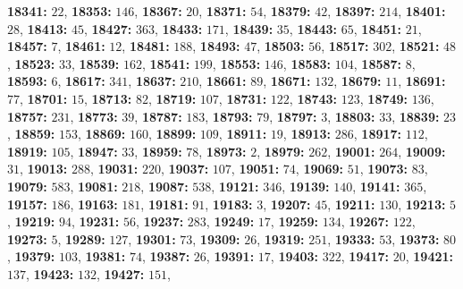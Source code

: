 \textsf{\bfseries 18341:} $22$, \textsf{\bfseries 18353:} $146$, \textsf{\bfseries 18367:} $20$, \textsf{\bfseries 18371:} $54$, \textsf{\bfseries 18379:} $42$, \textsf{\bfseries 18397:} $214$, \textsf{\bfseries 18401:} $28$, \textsf{\bfseries 18413:} $45$, \textsf{\bfseries 18427:} $363$, \textsf{\bfseries 18433:} $171$, \textsf{\bfseries 18439:} $35$, \textsf{\bfseries 18443:} $65$, \textsf{\bfseries 18451:} $21$, \textsf{\bfseries 18457:} $7$, \textsf{\bfseries 18461:} $12$, \textsf{\bfseries 18481:} $188$, \textsf{\bfseries 18493:} $47$, \textsf{\bfseries 18503:} $56$, \textsf{\bfseries 18517:} $302$, \textsf{\bfseries 18521:} $48$, \textsf{\bfseries 18523:} $33$, \textsf{\bfseries 18539:} $162$, \textsf{\bfseries 18541:} $199$, \textsf{\bfseries 18553:} $146$, \textsf{\bfseries 18583:} $104$, \textsf{\bfseries 18587:} $8$, \textsf{\bfseries 18593:} $6$, \textsf{\bfseries 18617:} $341$, \textsf{\bfseries 18637:} $210$, \textsf{\bfseries 18661:} $89$, \textsf{\bfseries 18671:} $132$, \textsf{\bfseries 18679:} $11$, \textsf{\bfseries 18691:} $77$, \textsf{\bfseries 18701:} $15$, \textsf{\bfseries 18713:} $82$, \textsf{\bfseries 18719:} $107$, \textsf{\bfseries 18731:} $122$, \textsf{\bfseries 18743:} $123$, \textsf{\bfseries 18749:} $136$, \textsf{\bfseries 18757:} $231$, \textsf{\bfseries 18773:} $39$, \textsf{\bfseries 18787:} $183$, \textsf{\bfseries 18793:} $79$, \textsf{\bfseries 18797:} $3$, \textsf{\bfseries 18803:} $33$, \textsf{\bfseries 18839:} $23$, \textsf{\bfseries 18859:} $153$, \textsf{\bfseries 18869:} $160$, \textsf{\bfseries 18899:} $109$, \textsf{\bfseries 18911:} $19$, \textsf{\bfseries 18913:} $286$, \textsf{\bfseries 18917:} $112$, \textsf{\bfseries 18919:} $105$, \textsf{\bfseries 18947:} $33$, \textsf{\bfseries 18959:} $78$, \textsf{\bfseries 18973:} $2$, \textsf{\bfseries 18979:} $262$, \textsf{\bfseries 19001:} $264$, \textsf{\bfseries 19009:} $31$, \textsf{\bfseries 19013:} $288$, \textsf{\bfseries 19031:} $220$, \textsf{\bfseries 19037:} $107$, \textsf{\bfseries 19051:} $74$, \textsf{\bfseries 19069:} $51$, \textsf{\bfseries 19073:} $83$, \textsf{\bfseries 19079:} $583$, \textsf{\bfseries 19081:} $218$, \textsf{\bfseries 19087:} $538$, \textsf{\bfseries 19121:} $346$, \textsf{\bfseries 19139:} $140$, \textsf{\bfseries 19141:} $365$, \textsf{\bfseries 19157:} $186$, \textsf{\bfseries 19163:} $181$, \textsf{\bfseries 19181:} $91$, \textsf{\bfseries 19183:} $3$, \textsf{\bfseries 19207:} $45$, \textsf{\bfseries 19211:} $130$, \textsf{\bfseries 19213:} $5$, \textsf{\bfseries 19219:} $94$, \textsf{\bfseries 19231:} $56$, \textsf{\bfseries 19237:} $283$, \textsf{\bfseries 19249:} $17$, \textsf{\bfseries 19259:} $134$, \textsf{\bfseries 19267:} $122$, \textsf{\bfseries 19273:} $5$, \textsf{\bfseries 19289:} $127$, \textsf{\bfseries 19301:} $73$, \textsf{\bfseries 19309:} $26$, \textsf{\bfseries 19319:} $251$, \textsf{\bfseries 19333:} $53$, \textsf{\bfseries 19373:} $80$, \textsf{\bfseries 19379:} $103$, \textsf{\bfseries 19381:} $74$, \textsf{\bfseries 19387:} $26$, \textsf{\bfseries 19391:} $17$, \textsf{\bfseries 19403:} $322$, \textsf{\bfseries 19417:} $20$, \textsf{\bfseries 19421:} $137$, \textsf{\bfseries 19423:} $132$, \textsf{\bfseries 19427:} $151$, 

